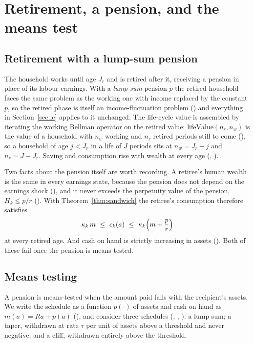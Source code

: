 \section{Retirement, a pension, and the means test}\label{sec:ret}

\subsection{Retirement with a lump-sum pension}

The household works until age $J_r$ and is retired after it, receiving a pension in place of its
labour earnings. With a \emph{lump-sum} pension $p$ the retired household faces the same problem
as the working one with income replaced by the constant $p$, so the retired phase is itself an
income-fluctuation problem () and everything in Section~\ref{sec:lc} applies to
it unchanged. The life-cycle value is assembled by iterating the working Bellman operator on the
retired value: $\mathrm{lifeValue}(n_r,n_w)$ is the value of a household with $n_w$ working and
$n_r$ retired periods still to come (), so a household of age $j<J_r$ in a life of
$J$ periods sits at $n_w=J_r-j$ and $n_r=J-J_r$. Saving and consumption rise with wealth at every
age (, ).

Two facts about the pension itself are worth recording. A retiree's human wealth is the same in
every earnings state, because the pension does not depend on the earnings shock
(), and it never exceeds the perpetuity value of the
pension, $H_k\le p/r$ (). With Theorem~\ref{thm:sandwich}
the retiree's consumption therefore satisfies
\[
  \kappa_k\,m\ \le\ c_k(a)\ \le\ \kappa_k\Bigl(m+\frac{p}{r}\Bigr)
\]
at every retired age. And cash on hand is strictly increasing in assets
(). Both of these fail once the pension is means-tested.

\subsection{Means testing}

A pension is means-tested when the amount paid falls with the recipient's assets. We write the
schedule as a function $p(\cdot)$ of assets and cash on hand as $m(a)=Ra+p(a)$ (),
and consider three schedules (, , ): a lump sum; a taper,
withdrawn at rate $\tau$ per unit of assets above a threshold and never negative; and a cliff,
withdrawn entirely above the threshold.

